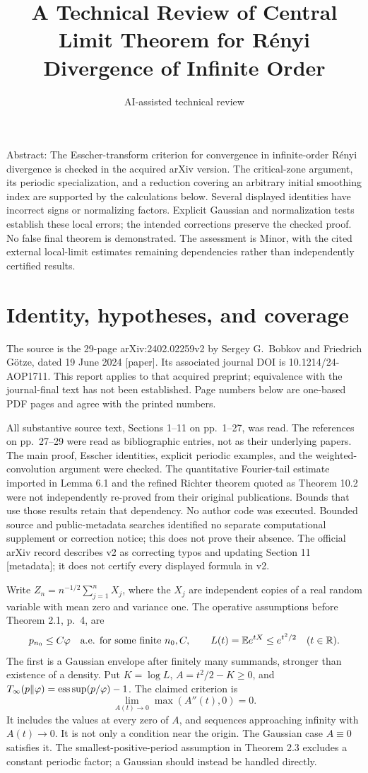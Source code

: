 \documentclass[10pt]{article}
\title{A Technical Review of
Central Limit Theorem for Rényi Divergence of Infinite Order}
\author{AI-assisted technical review}
\date{}
\begin{document}
\maketitle
Abstract: The Esscher-transform criterion for convergence in infinite-order Rényi divergence is checked in the acquired arXiv version. The critical-zone argument, its periodic specialization, and a reduction covering an arbitrary initial smoothing index are supported by the calculations below. Several displayed identities have incorrect signs or normalizing factors. Explicit Gaussian and normalization tests establish these local errors; the intended corrections preserve the checked proof. No false final theorem is demonstrated. The assessment is Minor, with the cited external local-limit estimates remaining dependencies rather than independently certified results.\par
\section*{Identity, hypotheses, and coverage}
The source is the 29-page arXiv:2402.02259v2 by Sergey G. Bobkov and Friedrich Götze, dated 19 June 2024 [paper]. Its associated journal DOI is 10.1214/24-AOP1711. This report applies to that acquired preprint; equivalence with the journal-final text has not been established. Page numbers below are one-based PDF pages and agree with the printed numbers.\par
All substantive source text, Sections 1–11 on pp. 1–27, was read. The references on pp. 27–29 were read as bibliographic entries, not as their underlying papers. The main proof, Esscher identities, explicit periodic examples, and the weighted-convolution argument were checked. The quantitative Fourier-tail estimate imported in Lemma 6.1 and the refined Richter theorem quoted as Theorem 10.2 were not independently re-proved from their original publications. Bounds that use those results retain that dependency. No author code was executed. Bounded source and public-metadata searches identified no separate computational supplement or correction notice; this does not prove their absence. The official arXiv record describes v2 as correcting typos and updating Section 11 [metadata]; it does not certify every displayed formula in v2.\par
Write \(Z_n=n^{-1/2}\sum_{j=1}^nX_j\), where the \(X_j\) are independent copies of a real random variable with mean zero and variance one. The operative assumptions before Theorem 2.1, p. 4, are \[p_{n_0}\le C\varphi\quad\hbox{a.e. for some finite }n_0,C,
 \qquad L(t)=\mathbb E e^{tX}\le e^{t^2/2}\quad(t\in\mathbb R).\] The first is a Gaussian envelope after finitely many summands, stronger than existence of a density. Put \(K=\log L\), \(A=t^2/2-K\ge0\), and \(T_\infty(p\Vert\varphi)=\mathop{\rm ess\,sup}(p/\varphi)-1\). The claimed criterion is \[\lim_{A(t)\to0}\max(A''(t),0)=0.                         \tag{1.1}\] It includes the values at every zero of \(A\), and sequences approaching infinity with \(A(t)\to0\). It is not only a condition near the origin. The Gaussian case \(A\equiv0\) satisfies it. The smallest-positive-period assumption in Theorem 2.3 excludes a constant periodic factor; a Gaussian should instead be handled directly.\par
\end{document}
